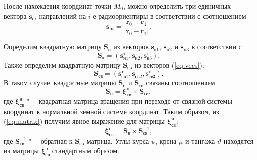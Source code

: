 \documentclass[../main.tex]{subfiles}
\begin{document}
После нахождения координат точки $M_0$, можно определить три единичных вектора $\mathbf{s}_{\text{н}i}$ направлений на $i$-е радиоориентиры
в соответствии с соотношением
\begin{equation*}
    \mathbf{s}_{\text{н}i} = \frac{\mathbf{r}_0 - \mathbf{r}_1}{|\mathbf{r}_0 - \mathbf{r}_1|}.
\end{equation*}

Определим квадратную матрицу $\mathbf{S}_{\text{н}}$ из векторов $\mathbf{s}_{\text{н}1}$, $\mathbf{s}_{\text{н}2}$ и $\mathbf{s}_{\text{н}3}$ в
соответствии с
\begin{equation*}
    \mathbf{S}_{\text{н}} = \left(\mathbf{s}_{\text{н}1}^\text{т}, \mathbf{s}_{\text{н}2}^\text{т}, \mathbf{s}_{\text{н}3}^\text{т}\right).
\end{equation*}
Также определим квадратную матрицу $\mathbf{S}_{\text{св}}$ из векторов (\ref{eq:vecs}):
\begin{equation*}
    \mathbf{S}_{\text{св}} = \left(\mathbf{s}_{\text{св}1}^\text{т}, \mathbf{s}_{\text{св}2}^\text{т}, \mathbf{s}_{\text{св}3}^\text{т}\right).
\end{equation*}
В таком случае, квадратные матрицы $\mathbf{S}_{\text{н}}$ и $\mathbf{S}_{\text{св}}$ связаны соотношением
\begin{equation}\label{eq:matrix}
    \mathbf{S}_{\text{н}} = \mathbf{\xi}_{\text{св}}^{\text{н}} \times \mathbf{S}_{\text{св}},
\end{equation}
где $\mathbf{\xi}_{\text{св}}^{\text{н}}$ "--- квадратная матрица вращения при переходе от связной системы координат к
нормальной земной системе координат. Таким образом, из (\ref{eq:matrix}) получим явное выражение для матрицы $\mathbf{\xi}_{\text{св}}^{\text{н}}$:
\begin{equation*}
    \mathbf{\xi}_{\text{св}}^{\text{н}} = \mathbf{S}_{\text{н}} \times \mathbf{S}_{\text{св}}^{-1},
\end{equation*}
где $\mathbf{S}_{\text{св}}^{-1}$ "--- обратная к $\mathbf{S}_{\text{св}}$ матрица. Углы курса $\psi$, крена $\mu$ и
тангажа $\vartheta$ находятся из матрицы $\mathbf{\xi}_{\text{св}}^{\text{н}}$ стандартным образом.

%
%
%
%
\end{document}
